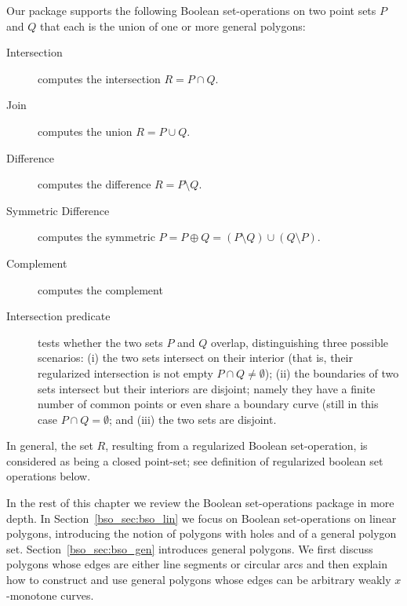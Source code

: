 Our package supports the following Boolean set-operations on two point
sets $P$ and $Q$ that each is the union of one or more general polygons:
\begin{description}
\item[Intersection] computes the intersection $R = P \cap Q$.
\item[Join] computes the union $R = P \cup Q$.
\item [Difference] computes the difference $R = P \setminus Q$.
\item [Symmetric Difference] computes the symmetric
   $P = P \oplus Q = (P \setminus Q) \cup (Q \setminus P)$.
\item[Complement] computes the complement
\item [Intersection predicate] tests whether the two sets $P$ and $Q$
  overlap, distinguishing three possible scenarios: (i) the two sets
  intersect on their interior (that is, their regularized intersection
  is not empty $P \cap Q \neq \emptyset$); (ii) the boundaries of two
  sets intersect but their interiors are disjoint; namely they have a
  finite number of common points or even share a boundary curve (still
  in this case $P \cap Q = \emptyset$; and (iii) the two sets are
  disjoint.
\end{description}
In general, the set $R$, resulting from a regularized Boolean
set-operation, is considered as being a closed point-set; see definition of regularized boolean set operations below.

In the rest of this chapter we review the Boolean set-operations package
in more depth. In Section~\ref{bso_sec:bso_lin} we focus on Boolean 
set-operations on linear polygons, introducing the notion of polygons with 
holes and of a general polygon set. Section~\ref{bso_sec:bso_gen}
introduces general polygons.
We first discuss polygons whose edges are either line segments or circular
arcs and then explain how to construct and use general polygons whose edges
can be arbitrary weakly $x$-monotone curves.
